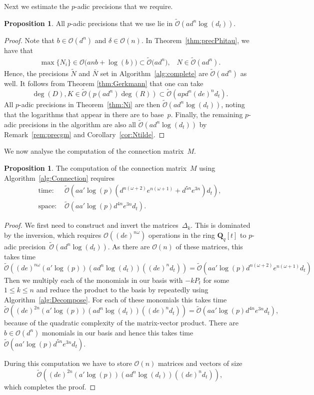 \documentclass[a4paper,11pt]{article}
\numberwithin{equation}{section}
\newcommand{\QQ}{\mathbf{Q}} %
\providecommand{\BigOh}{\mathcal{O}}          %
\providecommand{\SoftOh}{\tilde{\mathcal{O}}} %
\theoremstyle{definition}
\newtheorem{prop}[thm]{Proposition}
\begin{document}
Next we estimate the $p$-adic precisions that we require.

\begin{prop}
All $p$-adic precisions that we use lie in $\SoftOh(a d^n \log(d_t))$.
\end{prop}

\begin{proof}
Note that $b \in \BigOh(d^n)$ and $\delta \in \BigOh(n)$.  
In Theorem~\ref{thm:precPhitau}, we have that
\begin{eqnarray*}
\max\{N_i\} \in \BigOh\bigl(a n b + \log(b) \bigr) 
            \subset \SoftOh\bigl(a d^n \bigr), \;\;\;
N           \in \SoftOh(a d^n).
\end{eqnarray*}
Hence, the precisions $\tilde{N}$ and $\bar{N}$ set in 
Algorithm~\ref{alg:complete} are $\SoftOh(ad^n)$ as well.
It follows from Theorem \ref{thm:Gerkmann} that 
one can take 
\[
\deg(D), K \in \SoftOh(p (ad^n) \deg(R)) \subset  \SoftOh(apd^n (de)^n d_t).
\] 
All $p$-adic precisions in
Theorem~\ref{thm:Ni} are then $\SoftOh(ad^n \log(d_t))$,
noting that the logarithms that appear in there are 
to base~$p$.
Finally, the remaining $p$-adic precisions in the algorithm 
are also all $\SoftOh(a d^n \log(d_t))$ by Remark~\ref{rem:precgm} 
and Corollary~\ref{cor:Ntilde}.
\end{proof}

We now analyse the computation of the connection matrix~$M$.
\begin{prop}
The computation of the connection matrix~$M$ using 
Algorithm~\ref{alg:Connection} requires
\begin{align*}
\mbox{time: }  &\SoftOh(a a' \log(p) (d^{n(\omega+2)} e^{n(\omega+1)}+ d^{5n}e^{3n} ) d_t), \\
\mbox{space: } &\SoftOh(a a' \log(p) d^{4n}e^{3n} d_t).
\end{align*}
\end{prop}

\begin{proof}
We first need to construct and invert the matrices~$\Delta_k$.  This 
is dominated by the inversion, which requires $\BigOh((de)^{n \omega})$ 
operations in the ring $\QQ_q[t]$ to $p$-adic 
precision~$\SoftOh(a d^n \log(d_t))$. As there are $\BigOh(n)$ of 
these matrices, this takes time 
\[
\SoftOh((de)^{n \omega} (a' \log(p)) (a d^n \log(d_t)) ((de)^n d_t)) = 
    \SoftOh(a a' \log(p) d^{n(\omega+2)} e^{n(\omega+1)} d_t)
\]
Then we multiply each of the monomials in our basis with $-k P_t$ 
for some $1 \leq k \leq n$ and reduce the product to the basis by 
repeatedly using Algorithm~\ref{alg:Decompose}.  For each of these 
monomials this takes time 
\[
\SoftOh((de)^{2n} (a' \log(p)) (a d^n \log(d_t)) ((de)^n d_t)) = 
    \SoftOh(a a' \log(p) d^{4n}e^{3n} d_t),
\]
because of the quadratic complexity of the matrix-vector product.  
There are $b \in \BigOh(d^n)$ monomials in our basis and hence this 
takes time $\SoftOh(a a' \log(p) d^{5n}e^{3n} d_t)$.

During this computation we have to store $\BigOh(n)$ matrices 
and vectors of size 
\[
\SoftOh((de)^{2n} (a' \log(p)) (a d^n \log(d_t)) ((de)^n d_t)),
\] 
which completes the proof.
\end{proof}
\end{document}
